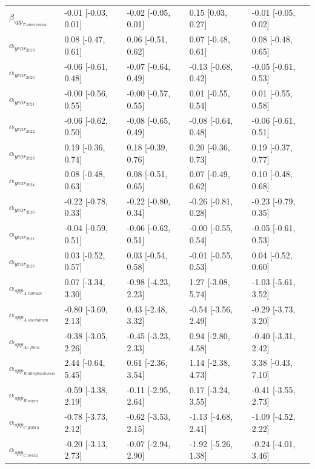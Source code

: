 \documentclass{article}\usepackage[]{graphicx}\usepackage[]{xcolor}
\begin{document}
\begin{table}[ht]
\begin{tabular}{lllll}
  $\beta_{spp_{T. americana}}$ & -0.01 [-0.03, 0.01] & -0.02 [-0.05, 0.01] & 0.15 [0.03, 0.27] & -0.01 [-0.05, 0.02] \\ 
  $\alpha_{year_{2019}}$ & 0.08 [-0.47, 0.61] & 0.06 [-0.51, 0.62] & 0.07 [-0.48, 0.61] & 0.08 [-0.48, 0.65] \\ 
  $\alpha_{year_{2020}}$ & -0.06 [-0.61, 0.48] & -0.07 [-0.64, 0.49] & -0.13 [-0.68, 0.42] & -0.05 [-0.61, 0.53] \\ 
  $\alpha_{year_{2021}}$ & -0.00 [-0.56, 0.55] & -0.00 [-0.57, 0.55] & 0.01 [-0.55, 0.54] & 0.01 [-0.55, 0.58] \\ 
  $\alpha_{year_{2022}}$ & -0.06 [-0.62, 0.50] & -0.08 [-0.65, 0.49] & -0.08 [-0.64, 0.48] & -0.06 [-0.61, 0.51] \\ 
  $\alpha_{year_{2023}}$ & 0.19 [-0.36, 0.74] & 0.18 [-0.39, 0.76] & 0.20 [-0.36, 0.73] & 0.19 [-0.37, 0.77] \\ 
  $\alpha_{year_{2024}}$ & 0.08 [-0.48, 0.63] & 0.08 [-0.51, 0.65] & 0.07 [-0.49, 0.62] & 0.10 [-0.48, 0.68] \\ 
  $\alpha_{year_{2016}}$ & -0.22 [-0.78, 0.33] & -0.22 [-0.80, 0.34] & -0.26 [-0.81, 0.28] & -0.23 [-0.79, 0.35] \\ 
  $\alpha_{year_{2017}}$ & -0.04 [-0.59, 0.51] & -0.06 [-0.62, 0.51] & -0.00 [-0.55, 0.54] & -0.05 [-0.61, 0.53] \\ 
  $\alpha_{year_{2018}}$ & 0.03 [-0.52, 0.57] & 0.03 [-0.54, 0.58] & -0.01 [-0.55, 0.53] & 0.04 [-0.52, 0.60] \\ 
  $\alpha_{spp_{A. rubrum}}$ & 0.07 [-3.34, 3.30] & -0.98 [-4.23, 2.23] & 1.27 [-3.08, 5.74] & -1.03 [-5.61, 3.52] \\ 
  $\alpha_{spp_{A. saccharum}}$ & -0.80 [-3.69, 2.13] & 0.43 [-2.48, 3.32] & -0.54 [-3.56, 2.49] & -0.29 [-3.73, 3.20] \\ 
  $\alpha_{spp_{Ae. flava}}$ & -0.38 [-3.05, 2.26] & -0.45 [-3.23, 2.33] & 0.94 [-2.80, 4.58] & -0.40 [-3.31, 2.42] \\ 
  $\alpha_{spp_{B. alleghaniensis}}$ & 2.44 [-0.64, 5.45] & 0.61 [-2.36, 3.54] & 1.14 [-2.38, 4.73] & 3.38 [-0.43, 7.10] \\ 
  $\alpha_{spp_{B. nigra}}$ & -0.59 [-3.38, 2.19] & -0.11 [-2.95, 2.64] & 0.17 [-3.24, 3.55] & -0.41 [-3.55, 2.73] \\ 
  $\alpha_{spp_{C. glabra}}$ & -0.78 [-3.73, 2.12] & -0.62 [-3.53, 2.15] & -1.13 [-4.68, 2.41] & -1.09 [-4.52, 2.22] \\ 
  $\alpha_{spp_{C. ovata}}$ & -0.20 [-3.13, 2.73] & -0.07 [-2.94, 2.90] & -1.92 [-5.26, 1.38] & -0.24 [-4.01, 3.46] \\ 

\end{tabular}
\end{table}
\end{document}
